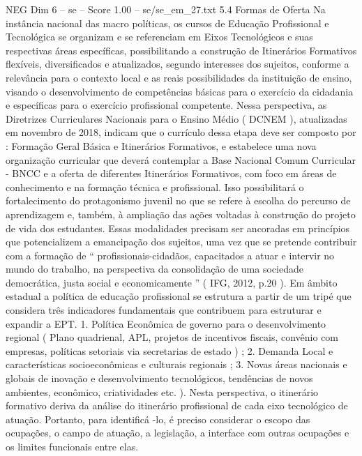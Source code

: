 \begin{textsample}{NEG Dim 6 – se – Score 1.00 – se/se\_em\_27.txt}  \label{ex:f6_neg_246}
5.4 Formas de Oferta Na instância nacional das macro políticas, os cursos de Educação Profissional e Tecnológica se organizam e se referenciam em Eixos Tecnológicos e suas respectivas áreas específicas, possibilitando a construção de Itinerários Formativos flexíveis, diversificados e atualizados, segundo interesses dos sujeitos, conforme a relevância para o contexto local e as reais possibilidades da instituição de ensino, visando o desenvolvimento de competências básicas para o exercício da cidadania e específicas para o exercício profissional competente.
Nessa perspectiva, as Diretrizes Curriculares Nacionais para o Ensino Médio ( DCNEM ), atualizadas em novembro de 2018, indicam que o currículo dessa etapa deve ser composto por : Formação Geral Básica e Itinerários Formativos, e estabelece uma nova organização curricular que deverá contemplar a Base Nacional Comum Curricular - BNCC e a oferta de diferentes Itinerários Formativos, com foco em áreas de conhecimento e na formação técnica e profissional.
Isso possibilitará o fortalecimento do protagonismo juvenil no que se refere à escolha do percurso de aprendizagem e, também, à ampliação das ações voltadas à construção do projeto de vida dos estudantes.
Essas modalidades precisam ser ancoradas em princípios que potencializem a emancipação dos sujeitos, uma vez que se pretende contribuir com a formação de “ profissionais-cidadãos, capacitados a atuar e intervir no mundo do trabalho, na perspectiva da consolidação de uma sociedade democrática, justa social e economicamente ” ( IFG, 2012, p.20 ).
Em âmbito estadual a política de educação profissional se estrutura a partir de um tripé que considera três indicadores fundamentais que contribuem para estruturar e expandir a EPT. 1.
Política Econômica de governo para o desenvolvimento regional ( Plano quadrienal, APL, projetos de incentivos fiscais, convênio com empresas, políticas setoriais via secretarias de estado ) ; 2.
Demanda Local e características socioeconômicas e culturais regionais ; 3.
Novas áreas nacionais e globais de inovação e desenvolvimento tecnológicos, tendências de novos ambientes, econômico, criatividades etc. ).
Nesta perspectiva, o itinerário formativo deriva da análise do itinerário profissional de cada eixo tecnológico de atuação.
Portanto, para identificá -lo, é preciso considerar o escopo das ocupações, o campo de atuação, a legislação, a interface com outras ocupações e os limites funcionais entre elas.

\end{textsample}
